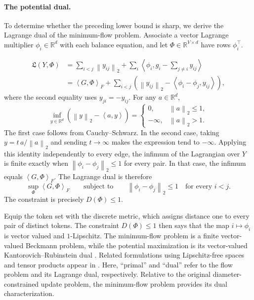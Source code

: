 \documentclass[anon]{opt2026} %
\newcommand{\R}{\mathbb{R}}
\newcommand{\norm}[1]{\left\lVert #1\right\rVert}
\newcommand{\inner}[2]{\left\langle #1,#2\right\rangle}
\begin{document}
\paragraph{The potential dual.}
To determine whether the preceding lower bound is sharp, we derive the Lagrange dual of the minimum-flow problem. Associate a vector Lagrange multiplier $\phi_i\in\R^d$ with each balance equation, and let $\Phi\in\R^{V\times d}$ have rows $\phi_i^\top$.

\[
\begin{aligned}
\mathfrak L(Y,\Phi)
&=
\sum_{i<j}\norm{y_{ij}}_2
+
\sum_i
\inner{\phi_i}{
g_i-\sum_{j\neq i}y_{ij}
} \\
&=
\inner{G}{\Phi}_F
+
\sum_{i<j}
\left(
\norm{y_{ij}}_2
-
\inner{\phi_i-\phi_j}{y_{ij}}
\right),
\end{aligned}
\]
where the second equality uses $y_{ji}=-y_{ij}$. For any $a\in\R^d$,
\[
\inf_{y\in\R^d}
\left(
\norm{y}_2-\inner{a}{y}
\right)
=
\begin{cases}
0, & \norm{a}_2\leq1,\\
-\infty, & \norm{a}_2>1.
\end{cases}
\]
The first case follows from Cauchy--Schwarz. In the second case, taking
$y=t\,a/\norm{a}_2$ and sending $t\to\infty$ makes the expression tend to
$-\infty$. Applying this identity independently to every edge, the infimum of the
Lagrangian over $Y$ is finite exactly when
$\norm{\phi_i-\phi_j}_2\leq1$ for every pair. In that case, the infimum equals
$\inner{G}{\Phi}_F$. The Lagrange dual is therefore
\[
\sup_{\Phi}\inner{G}{\Phi}_F
\qquad\text{subject to}\qquad
\norm{\phi_i-\phi_j}_2\leq1
\quad\text{for every }i<j.
\]
The constraint is precisely $D(\Phi)\leq1$.

Equip the token set with the discrete metric, which assigns distance one to
every pair of distinct tokens. The constraint $D(\Phi)\leq1$ then says that
the map $i\mapsto\phi_i$ is vector valued and $1$-Lipschitz. The minimum-flow problem is a finite vector-valued Beckmann problem, while
the potential maximization is its vector-valued Kantorovich--Rubinstein dual
\citep{ciosmak2021optimaltransportvectormeasures,
robertson2025generalizationwassersteindistancebeckmann}.
Related formulations using Lipschitz-free spaces and tensor products appear
in \citet{arens1956embedding,CHAVEZDOMINGUEZ2011387,
cabrerapadilla2015lipschitztensorproduct}. Here, ``primal'' and ``dual'' refer to the flow problem and its Lagrange dual, respectively. Relative to the original diameter-constrained update problem, the minimum-flow problem provides its dual characterization.
\end{document}

